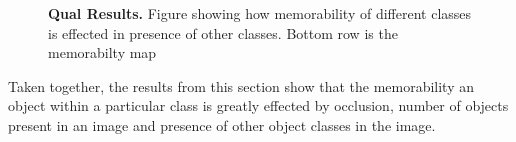 \begin{figure}[h]
\vspace{-5mm}\caption{\footnotesize\textbf{Qual Results.} Figure showing how memorability of different classes is effected in presence of other classes. Bottom row is the memorabilty map}\label{fig:qualInterClass}
\end{figure} 

Taken together, the results from this section show that the memorability an object within a particular class is greatly effected by occlusion, number of objects present in an image and presence of other object classes in the image.  
